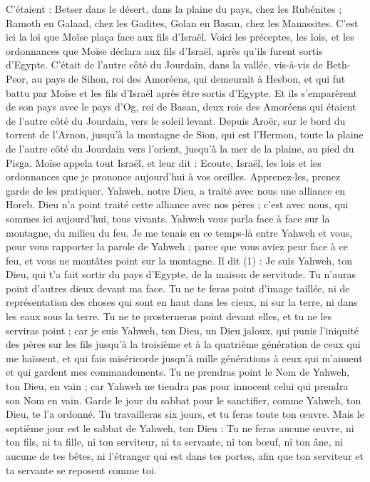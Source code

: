 \begin{multicols}{2}
C’étaient : Betser dans le désert, dans la plaine du pays, chez les Rubénites ; Ramoth en Galaad, chez les Gadites, Golan en Basan, chez les Manassites.
C'est ici la loi que Moïse plaça face aux fils d'Israël.
Voici les préceptes, les lois, et les ordonnances que Moïse déclara aux fils d'Israël, après qu'ils furent sortis d'Egypte.
C’était de l’autre côté du Jourdain, dans la vallée, vis-à-vis de Beth-Peor, au pays de Sihon, roi des Amoréens, qui demeurait à Hesbon, et qui fut battu par Moïse et les fils d'Israël après être sortis d'Egypte.
Et ils s’emparèrent de son pays avec le pays d’Og, roi de Basan, deux rois des Amoréens qui étaient de l’autre côté du Jourdain, vers le soleil levant.
Depuis Aroër, sur le bord du torrent de l'Arnon, jusqu'à la montagne de Sion, qui est l’Hermon,
toute la plaine de l’autre côté du Jourdain vers l'orient, jusqu'à la mer de la plaine, au pied du Pisga.
\VerseOne{}Moïse appela tout Israël, et leur dit : Ecoute, Israël, les lois et les ordonnances que je prononce aujourd'hui à vos oreilles. Apprenez-les, prenez garde de les pratiquer.
Yahweh, notre Dieu, a traité avec nous une alliance en Horeb.
Dieu n'a point traité cette alliance avec nos pères ; c’est avec nous, qui sommes ici aujourd'hui, tous vivants.
Yahweh vous parla face à face sur la montagne, du milieu du feu.
Je me tenais en ce temps-là entre Yahweh et vous, pour vous rapporter la parole de Yahweh ; parce que vous aviez peur face à ce feu, et vous ne montâtes point sur la montagne. Il dit (1) :
Je suis Yahweh, ton Dieu, qui t’a fait sortir du pays d'Egypte, de la maison de servitude.
Tu n'auras point d'autres dieux devant ma face.
Tu ne te feras point d'image taillée, ni de représentation des choses qui sont en haut dans les cieux, ni sur la terre, ni dans les eaux sous la terre.
Tu ne te prosterneras point devant elles, et tu ne les serviras point ; car je suis Yahweh, ton Dieu, un Dieu jaloux, qui punis l'iniquité des pères sur les fils jusqu'à la troisième et à la quatrième génération de ceux qui me haïssent,
et qui fais miséricorde jusqu'à mille générations à ceux qui m'aiment et qui gardent mes commandements.
Tu ne prendras point le Nom de Yahweh, ton Dieu, en vain ; car Yahweh ne tiendra pas pour innocent celui qui prendra son Nom en vain.
Garde le jour du sabbat pour le sanctifier, comme Yahweh, ton Dieu, te l'a ordonné.
Tu travailleras six jours, et tu feras toute ton œuvre.
Mais le septième jour est le sabbat de Yahweh, ton Dieu : Tu ne feras aucune œuvre, ni ton fils, ni ta fille, ni ton serviteur, ni ta servante, ni ton bœuf, ni ton âne, ni aucune de tes bêtes, ni l’étranger qui est dans tes portes, afin que ton serviteur et ta servante se reposent comme toi.

\end{multicols}
